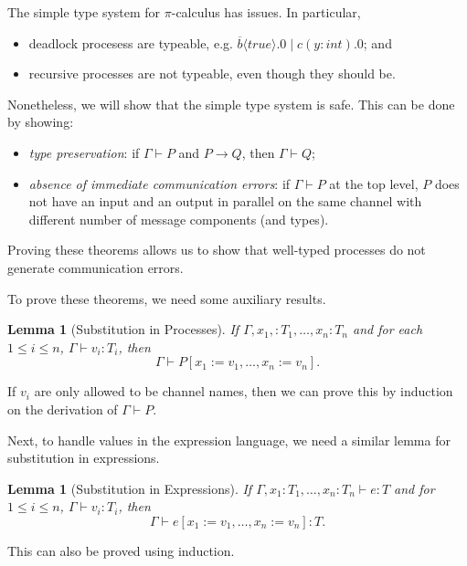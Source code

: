 \documentclass[a4paper, openany]{memoir}
\newtheorem{lemma}[proposition]{Lemma}
\theoremstyle{definition}
\begin{document}
    The simple type system for $\pi$-calculus has issues. In particular, 
    \begin{itemize}
        \item deadlock procesess are typeable, e.g. $\overline{b}\langle \textit{true} \rangle.0 \mid c(y \colon \textit{int}).0$; and
        \item recursive processes are not typeable, even though they should be.
    \end{itemize}
    
    Nonetheless, we will show that the simple type system is safe. This can be done by showing:
    \begin{itemize}
        \item \emph{type preservation}: if $\Gamma \vdash P$ and $P \to Q$, then $\Gamma \vdash Q$;
        \item \emph{absence of immediate communication errors}: if $\Gamma \vdash P$ at the top level, $P$ does not have an input and an output in parallel on the same channel with different number of message components (and types).
    \end{itemize}
    Proving these theorems allows us to show that well-typed processes do not generate communication errors.

    To prove these theorems, we need some auxiliary results.
    \begin{lemma}[Substitution in Processes]
        If $\Gamma, x_1, \colon T_1, \dots, x_n \colon T_n$ and for each $1 \leq i \leq n$, $\Gamma \vdash v_i \colon T_i$, then 
        \[\Gamma \vdash P[x_1 := v_1, \dots, x_n := v_n].\]
    \end{lemma}
    \noindent If $v_i$ are only allowed to be channel names, then we can prove this by induction on the derivation of $\Gamma \vdash P$.

    Next, to handle values in the expression language, we need a similar lemma for substitution in expressions.
    \begin{lemma}[Substitution in Expressions]
        If $\Gamma, x_1 \colon T_1, \dots, x_n \colon T_n \vdash e \colon T$ and for $1 \leq i \leq n$, $\Gamma \vdash v_i \colon T_i$, then
        \[\Gamma \vdash e[x_1 := v_1, \dots, x_n := v_n] \colon T.\]
    \end{lemma}
    \noindent This can also be proved using induction.
\end{document}
